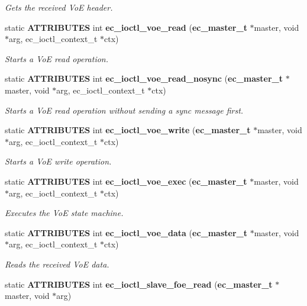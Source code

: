 \begin{DoxyCompactItemize}
\begin{DoxyCompactList}\small\item\em Gets the received Vo\-E header. \end{DoxyCompactList}\item 
static {\bf A\-T\-T\-R\-I\-B\-U\-T\-E\-S} int {\bf ec\-\_\-ioctl\-\_\-voe\-\_\-read} ({\bf ec\-\_\-master\-\_\-t} $\ast$master, void $\ast$arg, ec\-\_\-ioctl\-\_\-context\-\_\-t $\ast$ctx)
\begin{DoxyCompactList}\small\item\em Starts a Vo\-E read operation. \end{DoxyCompactList}\item 
static {\bf A\-T\-T\-R\-I\-B\-U\-T\-E\-S} int {\bf ec\-\_\-ioctl\-\_\-voe\-\_\-read\-\_\-nosync} ({\bf ec\-\_\-master\-\_\-t} $\ast$master, void $\ast$arg, ec\-\_\-ioctl\-\_\-context\-\_\-t $\ast$ctx)
\begin{DoxyCompactList}\small\item\em Starts a Vo\-E read operation without sending a sync message first. \end{DoxyCompactList}\item 
static {\bf A\-T\-T\-R\-I\-B\-U\-T\-E\-S} int {\bf ec\-\_\-ioctl\-\_\-voe\-\_\-write} ({\bf ec\-\_\-master\-\_\-t} $\ast$master, void $\ast$arg, ec\-\_\-ioctl\-\_\-context\-\_\-t $\ast$ctx)
\begin{DoxyCompactList}\small\item\em Starts a Vo\-E write operation. \end{DoxyCompactList}\item 
static {\bf A\-T\-T\-R\-I\-B\-U\-T\-E\-S} int {\bf ec\-\_\-ioctl\-\_\-voe\-\_\-exec} ({\bf ec\-\_\-master\-\_\-t} $\ast$master, void $\ast$arg, ec\-\_\-ioctl\-\_\-context\-\_\-t $\ast$ctx)
\begin{DoxyCompactList}\small\item\em Executes the Vo\-E state machine. \end{DoxyCompactList}\item 
static {\bf A\-T\-T\-R\-I\-B\-U\-T\-E\-S} int {\bf ec\-\_\-ioctl\-\_\-voe\-\_\-data} ({\bf ec\-\_\-master\-\_\-t} $\ast$master, void $\ast$arg, ec\-\_\-ioctl\-\_\-context\-\_\-t $\ast$ctx)
\begin{DoxyCompactList}\small\item\em Reads the received Vo\-E data. \end{DoxyCompactList}\item 
static {\bf A\-T\-T\-R\-I\-B\-U\-T\-E\-S} int {\bf ec\-\_\-ioctl\-\_\-slave\-\_\-foe\-\_\-read} ({\bf ec\-\_\-master\-\_\-t} $\ast$master, void $\ast$arg)

\end{DoxyCompactItemize}
